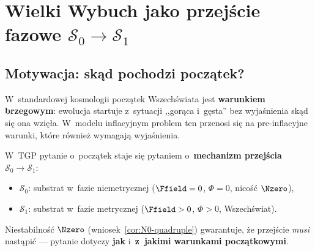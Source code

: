 \section{Wielki Wybuch jako przej\'scie fazowe $\mathcal{S}_0 \to \mathcal{S}_1$}%
\label{app:wielki-wybuch}

\subsection{Motywacja: sk\k{a}d pochodzi pocz\k{a}tek?}%
\label{app:G-motywacja}

W~standardowej kosmologii pocz\k{a}tek Wszech\'swiata jest
\textbf{warunkiem brzegowym}: ewolucja startuje z~sytuacji
,,gor\k{a}ca i~g\k{e}sta'' bez wyja\'snienia sk\k{a}d si\k{e}
ona wzi\k{e}\l{}a. W~modelu inflacyjnym problem ten przenosi si\k{e}
na pre-inflacyjne warunki, kt\'ore r\'ownie\.z wymagaj\k{a} wyja\'snienia.

W~TGP pytanie o~pocz\k{a}tek staje si\k{e} pytaniem o~\textbf{mechanizm
przej\'scia} $\mathcal{S}_0 \to \mathcal{S}_1$:
\begin{itemize}[nosep]
  \item $\mathcal{S}_0$: substrat w~fazie niemetrycznej
        ($\Ffield = 0$, $\Phi = 0$, nico\'s\'c $\Nzero$),
  \item $\mathcal{S}_1$: substrat w~fazie metrycznej
        ($\Ffield > 0$, $\Phi > 0$, Wszech\'swiat).
\end{itemize}

Niestabilno\'s\'c $\Nzero$ (wniosek~\ref{cor:N0-quadruple})
gwarantuje, \.ze przej\'scie \emph{musi} nast\k{a}pi\'c ---
pytanie dotyczy \textbf{jak} i~\textbf{z~jakimi warunkami
pocz\k{a}tkowymi}.

